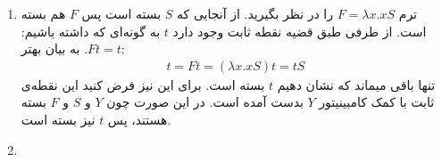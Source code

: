 \begin{enumerate}[label= \textbf{(\alph*)}]
    \item 
        ترم 
        $F = \lambda x. x S$ 
        را در نظر بگیرید. از آنجایی که  $S$ بسته است پس $F$ هم بسته است. از طرفی طبق قضیه نقطه‌ ثابت وجود دارد $t$ به گونه‌ای که داشته باشیم:
        $Ft = t$. به بیان بهتر:
        \begin{gather*}
            t = Ft = (\lambda x. x S) t = t S
        \end{gather*}
        تنها باقی میماند که نشان دهیم 
        $t$
        بسته است. برای این نیز فرض کنید این نقطه‌ی ثابت با کمک 
        کامبینیتور $Y$ بدست آمده است. 
        در این صورت چون $Y$ و $S$ و $F$ بسته هستند، پس $t$ نیز بسته است.
    \item
        
\end{enumerate}